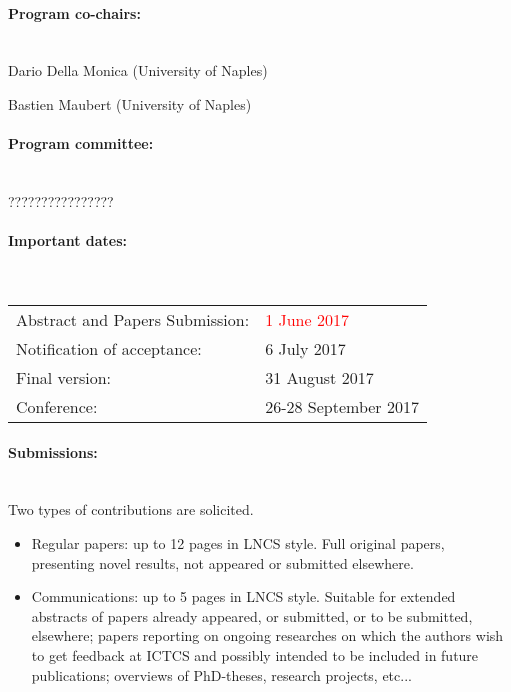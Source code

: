 \documentclass[11pt]{article}
\begin{document}
\begin{spacing}{1}
\paragraph{Program co-chairs:}
~\\

 Dario Della Monica (University of Naples)%

Bastien Maubert (University of Naples)%

\paragraph{Program committee:}
~\\

????????????????
\paragraph{Important dates:}
~\\

\begin{tabular}{ll}
Abstract and Papers Submission:&  \textcolor{red}{1 June 2017}\\
Notification of acceptance:&    6 July 2017\\
Final version:&               31 August 2017\\
Conference:&              26-28 September 2017  
\end{tabular}

\paragraph{Submissions:}
~\\

Two types of contributions are solicited.

\begin{itemize}
\item Regular papers: up to 12 pages in LNCS style. Full original papers,
presenting novel results, not appeared or submitted elsewhere.

\item Communications: up to 5 pages in LNCS style. Suitable for extended
abstracts of papers already appeared, or submitted, or to be
submitted, elsewhere; papers reporting on ongoing researches on which
the authors wish to get feedback at ICTCS and possibly intended to be
included in future publications; overviews of PhD-theses, research
projects, etc...
\end{itemize}


\end{spacing}
\end{document}
